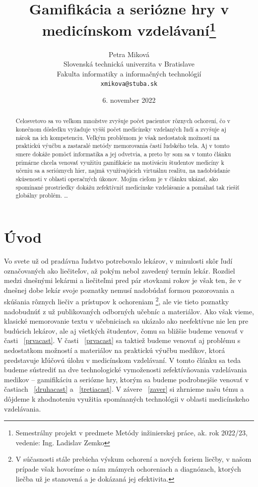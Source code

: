 \documentclass[10pt,twoside,slovak,a4paper]{article}
\title{Gamifikácia a seriózne hry v medicínskom vzdelávaní\thanks{Semestrálny projekt v predmete Metódy inžinierskej práce, ak. rok 2022/23, vedenie: Ing. Ladislav Zemko}}
\author{Petra Miková\\[2pt]
	{\small Slovenská technická univerzita v Bratislave}\\
	{\small Fakulta informatiky a informačných technológií}\\
	{\small \texttt{xmikova@stuba.sk}}
	}
\date{\small 6. november 2022}
\begin{document}
\maketitle

\begin{abstract}
Celosvetovo sa vo veľkom množstve zvyšuje počet pacientov rôznych ochorení, čo v konečnom dôsledku vyžaduje vyšší počet medicínsky vzdelaných ľudí a zvyšuje aj nárok na ich kompetenciu. Veľkým problémom je však nedostatok možností na praktickú výučbu a zastaralé metódy memorovania častí ľudského tela. Aj v tomto smere dokáže pomôcť informatika a jej odvetvia, a preto by som sa v tomto článku primárne chcela venovať využitiu gamifikácie na motiváciu študentov medicíny k učeniu sa a serióznych hier, najmä využívajúcich virtuálnu realitu, na nadobúdanie skúsenosti v oblasti operačných úkonov. Mojim cieľom je v článku ukázať, ako spomínané prostriedky dokážu zefektívniť medicínske vzdelávanie a pomáhať tak riešiť globálny problém.
\ldots
\end{abstract}



\section{Úvod}

Vo svete už od pradávna ľudstvo potrebovalo lekárov, v minulosti skôr ľudí označovaných ako liečiteľov, až pokým nebol zavedený termín lekár. Rozdiel medzi dnešnými lekármi a liečiteľmi pred pár stovkami rokov je však ten, že v dnešnej dobe lekár svoje poznatky nemusí nadobúdať formou pozorovania a skúšania rôznych liečiv a prístupov k ochoreniam \footnote{V súčasnosti stále prebieha výskum ochorení a nových foriem liečby, v našom prípade však hovoríme o nám známych ochoreniach a diagnózach, ktorých liečba už je stanovená a je dokázaná jej efektivita.}, ale vie tieto poznatky nadobudnúť z už publikovaných odborných učebníc a materiálov. Ako však vieme, klasické memorovanie textu v učebniciach sa ukázalo ako neefektívne \cite{Klemm2007WhatGI} nie len pre budúcich lekárov, ale aj všetkých študentov, čomu sa bližšie budeme venovať v časti ~\ref{prvacast}. V časti ~\ref{prvacast} sa taktiež budeme venovať aj problému s nedostatkom možností a materiálov na praktickú výučbu medikov, ktorá predstavuje kľúčovú úlohu v medicínskom vzdelávaní. V tomto článku sa teda budeme sústrediť na dve technologické vymoženosti zefektívňovania vzdelávania medikov – gamifikáciu a seriózne hry, ktorým sa budeme podrobnejšie venovať v častiach ~\ref{druhacast} a ~\ref{tretiacast}. V závere ~\ref{zaver} si zhrnieme našu tému a dôjdeme k zhodnoteniu využitia spomínaných technológii v oblasti medicínskeho vzdelávania.
\end{document}
